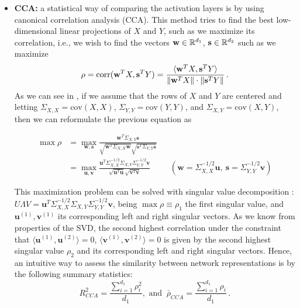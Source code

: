 \documentclass[../main.tex]{subfiles}
\begin{document}
\begin{itemize}
    \item \textbf{CCA:} a statistical way of comparing the activation layers is by using canonical correlation analysis (CCA). This method tries to find the best low-dimensional linear projections of $X$ and $Y$, such as we maximize its correlation, i.e., we wish to find the vectors $\mathbf{w} \in \mathbb{R}^{d_1}$, $\mathbf{s} \in \mathbb{R}^{d_2}$ such as we maximize
    \[
    \rho = \text{corr}(\mathbf{w}^T X, \mathbf{s}^T Y ) = \frac{\langle \mathbf{w}^T X, \mathbf{s}^T Y \rangle}{\left\lVert \mathbf{w}^T X \right\rVert \cdot \left\lVert \mathbf{s}^T Y \right\rVert}\,.
    \]
    As we can see in \cite{morcos_insights_2018}, if we assume that the rows of $X$ and $Y$ are centered and letting $\Sigma_{X, X}= \text{cov}(X,X)$, $\Sigma_{Y, Y}= \text{cov}(Y,Y)$, and $\Sigma_{X, Y}= \text{cov}(X, Y)$, then we can reformulate the previous equation as

    \begin{align*}
    \max \rho &= \max_{\mathbf{w, s}} \frac{\mathbf{w}^T \Sigma_{X,Y} \mathbf{s}}{\sqrt{\mathbf{w}^T \Sigma_{X, X} \mathbf{w}} \sqrt{\mathbf{s}^T \Sigma_{Y, Y} \mathbf{s}}}\\
    &= \max_{\mathbf{u, v}} \frac{\mathbf{u}^T \Sigma_{X,X}^{-1/2} \Sigma_{X,Y} \Sigma_{Y,Y}^{-1/2} \mathbf{v}}{\sqrt{\mathbf{u}^T \mathbf{u}} \sqrt{\mathbf{v}^T \mathbf{v}}} && \left( \mathbf{w}= \Sigma_{X,X}^{-1/2} \mathbf{u},\ \mathbf{s} =  \Sigma_{Y,Y}^{-1/2} \mathbf{v} \right) 
    \end{align*}

    This maximization problem can be solved with singular value decomposition \cite{morcos_insights_2018}: $U \Lambda V =  \mathbf{u}^T \Sigma_{X,X}^{-1/2} \Sigma_{X,Y} \Sigma_{Y,Y}^{-1/2} \mathbf{v}$, being $\max \rho \equiv \rho_1$ the first singular value, and $\mathbf{u}^{(1)}, \mathbf{v}^{(1)}$ its corresponding left and right singular vectors. As we know from properties of the SVD, the second highest correlation under the constraint that $\langle \mathbf{u}^{(1)}, \mathbf{u}^{(2)} \rangle=0$, $\langle \mathbf{v}^{(1)}, \mathbf{v}^{(2)} \rangle=0$ is given by the second highest singular value $\rho_2$ and its corresponding left and right singular vectors. Hence, an intuitive way to assess the similarity between network representations is by the following summary statistics:
    \[
        R_{CCA}^2 = \frac{\sum_{i=1}^{d_1}\rho_i^2}{d_1},\text{ and }\ 
        \bar{\rho}_{CCA} = \frac{\sum_{i=1}^{d_1}\rho_i}{d_1}\,.
    \]
    

\end{itemize}
\end{document}
